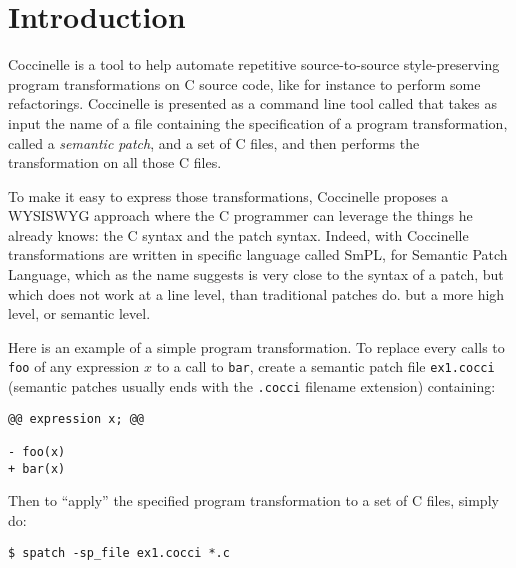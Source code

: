 \chapter{Introduction}

Coccinelle is a tool to help automate repetitive 
source-to-source style-preserving program transformations
on C source code, like for instance to perform some refactorings.
Coccinelle is presented as a command line tool called \spatch that takes
as input the name of a file containing the specification of a program
transformation, called a {\em semantic patch}, and a set of C files,
and then performs the transformation on all those C files.

To make it easy to express those transformations,
Coccinelle proposes a WYSISWYG approach where the C programmer 
can leverage the things he already knows: the C syntax
and the patch syntax. Indeed, with Coccinelle transformations
are written in specific language called SmPL, for 
Semantic Patch Language, which as the name suggests is very
close to the syntax of a patch, but which does not 
work at a line level, than traditional patches do.
but a more high level, or semantic level.

Here is an example of a simple program transformation.
To replace every calls to \verb+foo+ of any expression $x$ 
to a call to \verb+bar+, create a semantic patch file \verb+ex1.cocci+
(semantic patches usually ends with the \verb+.cocci+  filename extension)
containing:
\begin{verbatim}
@@ expression x; @@

- foo(x)
+ bar(x)

\end{verbatim}

Then to ``apply'' the specified program transformation to a set of C files,
simply do:
\begin{verbatim}
$ spatch -sp_file ex1.cocci *.c
\end{verbatim}






